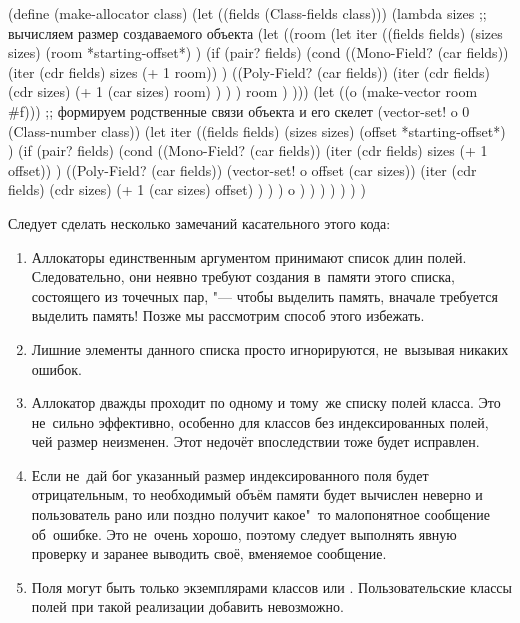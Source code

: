 \begin{code:lisp}
(define (make-allocator class)
  (let ((fields (Class-fields class)))
    (lambda sizes
      ;; вычисляем размер создаваемого объекта
      (let ((room (let iter ((fields fields)
                             (sizes sizes)
                             (room *starting-offset*) )
                    (if (pair? fields)
                        (cond ((Mono-Field? (car fields))
                               (iter (cdr fields) sizes (+ 1 room)) )
                              ((Poly-Field? (car fields))
                               (iter (cdr fields) (cdr sizes)
                                     (+ 1 (car sizes) room) ) ) )
                        room ) )))
        (let ((o (make-vector room #f)))
          ;; формируем родственные связи объекта и его скелет
          (vector-set! o 0 (Class-number class))
          (let iter ((fields fields)
                     (sizes sizes)
                     (offset *starting-offset*) )
            (if (pair? fields)
                (cond ((Mono-Field? (car fields))
                       (iter (cdr fields) sizes (+ 1 offset)) )
                      ((Poly-Field? (car fields))
                       (vector-set! o offset (car sizes))
                       (iter (cdr fields) (cdr sizes)
                             (+ 1 (car sizes) offset) ) ) )
                o ) ) ) ) ) ) )
\end{code:lisp}


Следует сделать несколько замечаний касательного этого кода:

\begin{enumerate}
  \item Аллокаторы единственным аргументом принимают список длин полей.
        Следовательно, они неявно требуют создания в~памяти этого списка,
        состоящего из точечных пар, "--- чтобы выделить память, вначале
        требуется выделить память! Позже мы рассмотрим способ этого избежать.

  \item Лишние элементы данного списка просто игнорируются, не~вызывая
        никаких ошибок.

  \item Аллокатор дважды проходит по одному и тому~же списку полей класса.
        Это не~сильно эффективно, особенно для классов без индексированных
        полей, чей размер неизменен. Этот недочёт впоследствии тоже будет
        исправлен.

  \item Если не~дай бог указанный размер индексированного поля будет
        отрицательным, то необходимый объём памяти будет вычислен неверно и
        пользователь рано или поздно получит какое"~то малопонятное сообщение
        об~ошибке. Это не~очень хорошо, поэтому следует выполнять явную
        проверку и заранее выводить своё, вменяемое сообщение.

  \item Поля могут быть только экземплярами классов  или
        . Пользовательские классы полей при такой реализации
        добавить невозможно.
\end{enumerate}


